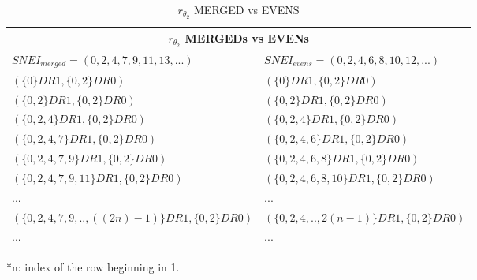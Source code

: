 	\begin{table}[h!]
		\begin{center}
			\begin{tabular}{|l||l|}
				\hline
				\multicolumn{2}{|c|}{\cellcolor{lightgray} {$r_{\theta_{2}}$ MERGEDs vs EVENs } } \\
				\hline
				$SNEI_{merged} = (0,2,4,7,9,11,13,...)$ & $ SNEI_{evens} = (0,2,4,6,8,10,12,...)$   \\
				\hline
				\hline
				\cellcolor{bosunired!50}  $ ( \{0\}DR1, \{0,2\}DR0 ) $        & \cellcolor{bosunired!50}  $ ( \{0\}DR1, \{0,2\}DR0 ) $ \\
				\hline
				\cellcolor{bosunired!50}  $ ( \{0,2\}DR1, \{0,2\}DR0 ) $      & \cellcolor{bosunired!50}  $ ( \{0,2\}DR1, \{0,2\}DR0 ) $ \\
				\hline
				\cellcolor{bosunired!50}  $ ( \{0,2,4\}DR1, \{0,2\}DR0 ) $    & \cellcolor{bosunired!50}  $ ( \{0,2,4\}DR1, \{0,2\}DR0 ) $ \\
				\hline
				\cellcolor{applegreen!50} $ ( \{0,2,4,7\}DR1, \{0,2\}DR0 ) $  & \cellcolor{applegreen!50} $ ( \{0,2,4,6\}DR1, \{0,2\}DR0 ) $ \\
				\hline
				$ ( \{0,2,4,7,9\}DR1, \{0,2\}DR0 ) $ & $ ( \{0,2,4,6,8\}DR1, \{0,2\}DR0 ) $ \\
				\hline
				$ ( \{0,2,4,7,9,11\}DR1, \{0,2\}DR0 ) $ & $ ( \{0,2,4,6,8,10\}DR1, \{0,2\}DR0 ) $ \\
				\hline
				... & ... \\
				\hline
				$ (\{0,2,4,7,9,.., ((2n)-1)\}DR1, \{0,2\}DR0 )$ & $ (\{0,2,4,.., 2(n-1) \}DR1, \{0,2\}DR0 )$ \\
				\hline
				... & ... \\
				\hline
				
			\end{tabular}
			\caption{$r_{\theta_{2}}$  MERGED vs EVENS}
			\label{tab: r_theta_2_merged_vs_evens}
		\end{center}
	\end{table}
	
	\noindent
	*n: index of the row beginning in 1.
	\\\\
	
